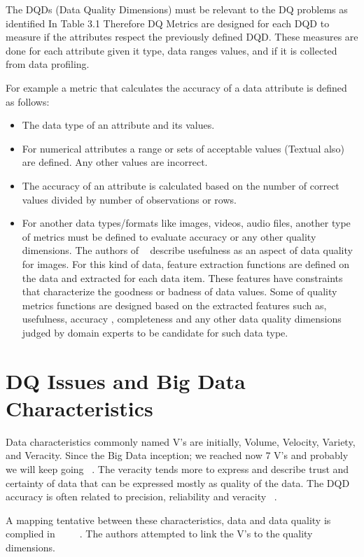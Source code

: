 The DQDs (Data Quality Dimensions) must be relevant to the DQ problems as identified In Table 3.1 Therefore DQ Metrics are 
designed for each DQD to measure if the attributes respect the previously defined DQD. These measures
are done for each attribute given it type, data ranges values, and if it is collected from data profiling.

For example a metric that calculates the accuracy of a data attribute is defined as follows:

\begin{itemize}
  \item{
    The data type of an attribute and its values.}
  \item{
    For numerical attributes a range or sets of acceptable values (Textual also) are defined.
    Any other values are incorrect.
  }
  \item {
	The accuracy of an attribute is calculated based on the number of correct values divided by number of observations or rows.
  }
  \item{
	  For another data types/formats like images, videos, audio files, another type of metrics must be defined to evaluate
	  accuracy or any other quality dimensions. The authors of ~\cite{Firmani2015} describe usefulness as an aspect of data quality
	  for images. For this kind of data, feature extraction functions are defined on the data and extracted 
	  for each data item. These features have constraints that characterize the goodness or badness 
	  of data values. Some of quality metrics functions are designed based on the extracted features such as, usefulness, accuracy
	  , completeness and any other data quality dimensions judged by domain experts to be candidate for 
	  such data type. 
  }
\end{itemize}

\section{DQ Issues and Big Data Characteristics}

Data characteristics commonly named V's are initially, Volume, Velocity, Variety, and Veracity. Since the Big Data inception; 
we reached now 7 V's and probably we will keep going ~\cite{Gupta}. The veracity tends more to express and describe trust and certainty of data that can be expressed mostly as quality of the data. 
The DQD accuracy is often related to precision, reliability and veracity ~\cite{Laboisse}.

A mapping tentative between these characteristics, data and data quality is complied in ~\citep{Caballero} ~\cite{Firmani2015} ~\cite{Zhu}.
The authors attempted to link the V's to the quality dimensions.

